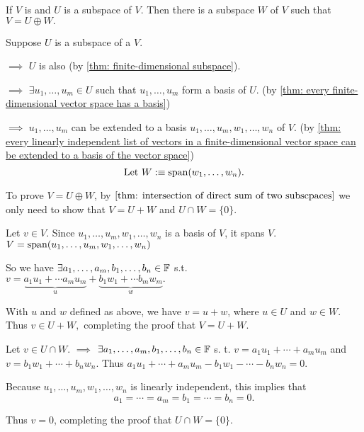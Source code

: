 \begin{thm} 
  \label{thm: every subspace of V is part of a direct sum equal to V}
  If $V$ is \fd and $U$ is a subspace of $V$. Then there is a subspace $W$ of $V$ such that $V=U \oplus W.$
\end{thm}
\begin{prf}
  Suppose $U$ is a subspace of a \fdvs $V$. 
  
  $\implies$ $U$ is also \fd (by \ref{thm: finite-dimensional subspace}). 
  
  $\implies$ $\exists u_1, \ldots, u_m \in U $ such that $u_1, \ldots, u_m $ form a basis of $U$. (by \ref{thm: every finite-dimensional vector space has a basis}) 
  
  $\implies$ $u_1, \ldots, u_m$ can be extended to a basis $u_1, \ldots, u_m, w_1, \ldots, w_n$ of $V$. (by \ref{thm: every linearly independent list of vectors in a finite-dimensional vector space can be extended to a basis of the vector space})
  \begin{equation}
    $Let $W :\equiv \myspan{w_1, \ldots, w_n}.
  \end{equation}
  
  To prove $V=U\oplus W$, by $\ref{thm: intersection of direct sum of two subscpaces}$ we only need to show that $V = U+W$ and $U \cap W = \{0\}$.

  
  \begin{description}
    \item{} Let $v \in V$. Since $u_1, \ldots, u_m, w_1, \ldots, w_n$ is a basis of $V$, it spans $V$. $V = \operatorname{span} (u_1, \ldots, u_m, w_1, \ldots, w_n)$
    
    So we have $\exists a_1, \ldots, a_m, b_1, \ldots, b_n \in \mathbb{F}$ s.t. \\
    $v = \underbrace{a_1 u_1 + \cdots a_m u_m}_{u} + \underbrace{b_1 w_1 + \cdots b_m w_m}_{w}.$
    
    With $u$ and $w$ defined as above, we have $v=u+w$, where $u \in U$ and $w \in W$. Thus $v \in U+W,$ completing the proof that $V=U+W$.
    
    \item{} Let $v \in U \cap W$. $\implies$ $\exists a_1, \ldots, a_m, b_1, \ldots, b_n \in \mathbb{F}$ s. t. $v= a_1 u _1 + \cdots + a_m u_m$ and $v= b_1 w_1 + \cdots + b_n w_n$. Thus $a_1 u_1 + \cdots + a_m u_m - b_1 w_1 - \cdots - b_n w_n = 0$.
    
    Because $u_1, \ldots, u_m, w_1, \ldots, w_n$ is linearly independent, this implies that
    \begin{equation}
      a_1 = \cdots = a_m = b_1 = \cdots= b_n = 0.
    \end{equation}
    
    Thus $v=0$, completing the proof that $U\cap W = \{0\}.$
    
  \end{description}
  \vspace{-1em}
\end{prf}

